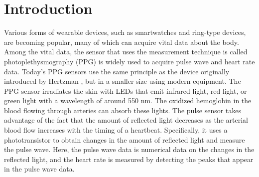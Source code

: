 \documentclass[sigconf]{acmart}
\begin{document}
\section{Introduction}
Various forms of wearable devices, such as smartwatches and ring-type devices, are becoming popular, many of which can acquire vital data about the body. Among the vital data, the sensor that uses the measurement technique is called photoplethysmography (PPG) \cite{ppg} is widely used to acquire pulse wave and heart rate data. Today's PPG sensors use the same principle as the device originally introduced by Hertzman \cite{ppg_principle1, ppg_principle2}, but in a smaller size using modern equipment. The PPG sensor irradiates the skin with LEDs that emit infrared light, red light, or green light with a wavelength of around 550 nm. The oxidized hemoglobin in the blood flowing through arteries can absorb these lights. The pulse sensor takes advantage of the fact that the amount of reflected light decreases as the arterial blood flow increases with the timing of a heartbeat. Specifically, it uses a phototransistor to obtain changes in the amount of reflected light and measure the pulse wave. Here, the pulse wave data is numerical data on the changes in the reflected light, and the heart rate is measured by detecting the peaks that appear in the pulse wave data.\par
\end{document}
